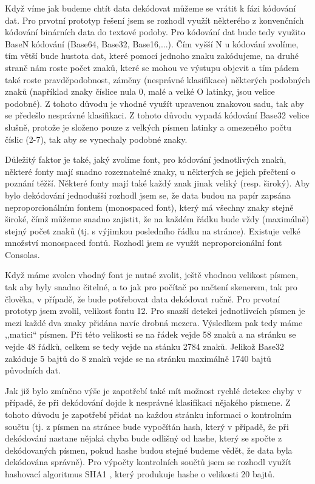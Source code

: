 \documentclass[conference]{IEEEtran}
\begin{document}
Když víme jak budeme chtít data dekódovat můžeme se vrátit k fázi kódování dat. Pro prvotní prototyp řešení jsem se rozhodl využít některého z konvenčních kódování binárních data do textové podoby. Pro kódování dat bude tedy využito BaseN kódování \cite{RFC4648} (Base64, Base32, Base16,...). Čím vyšší N u kódování zvolíme, tím větší bude hustota dat, které pomocí jednoho znaku zakódujeme, na druhé straně nám roste počet znaků, které se mohou ve výstupu objevit a tím pádem také roste pravděpodobnost, záměny (nesprávné klasifikace) některých podobných znaků (například znaky číslice nula 0, malé a velké O latinky, jsou velice podobné). Z tohoto důvodu je vhodné využít upravenou znakovou sadu, tak aby se předešlo nesprávné klasifikaci. Z tohoto důvodu vypadá kódování Base32 velice slušně, protože je složeno pouze z velkých písmen latinky a omezeného počtu číslic (2-7), tak aby se vynechaly podobné znaky.

Důležitý faktor je také, jaký zvolíme font, pro kódování jednotlivých znaků, některé fonty mají snadno rozeznatelné znaky, u některých se jejich přečtení o poznání těžší. Některé fonty mají také každý znak jinak veliký (resp. široký). Aby bylo dekódování jednodušší rozhodl jsem se, že data budou na papír zapsána neproporcionálním fontem \cite{Book:TheTypographicDeskReference} (monospaced font), který má všechny znaky stejně široké, čímž můžeme snadno zajistit, že na každém řádku bude vždy (maximálně) stejný počet znaků (tj. s výjimkou posledního řádku na stránce). Existuje velké množství monospaced fontů. Rozhodl jsem se využít neproporcionální font Consolas.

Když máme zvolen vhodný font je nutné zvolit, ještě vhodnou velikost písmen, tak aby byly snadno čitelné, a to jak pro počítač po načtení skenerem, tak pro člověka, v případě, že bude potřebovat data dekódovat ručně. Pro prvotní prototyp jsem zvolil, velikost fontu 12. Pro snazší detekci jednotlivcích písmen je mezi každé dva znaky přidána navíc drobná mezera. Výsledkem pak tedy máme ,,matici`` písmen. Při této velikosti se na řádek vejde 58 znaků a na stránku se vejde 48 řádků, celkem se tedy vejde na stánku 2784 znaků. Jelikož Base32 zakóduje 5 bajtů do 8 znaků vejde se na stránku maximálně 1740 bajtů původních dat.

Jak již bylo zmíněno výše je zapotřebí také mít možnost rychlé detekce chyby v případě, že při dekódování dojde k nesprávné klasifikaci nějakého písmene. Z tohoto důvodu je zapotřebí přidat na každou stránku informaci o kontrolním součtu (tj. z písmen na stránce bude vypočítán hash, který v případě, že při dekódování nastane nějaká chyba bude odlišný od hashe, který se spočte z dekódovaných písmen, pokud hashe budou stejné budeme vědět, že data byla dekódována správně). Pro výpočty kontrolních součtů jsem se rozhodl využít hashovací algoritmus SHA1 \cite{RFC3174}, který produkuje hashe o velikosti 20 bajtů.
\end{document}
